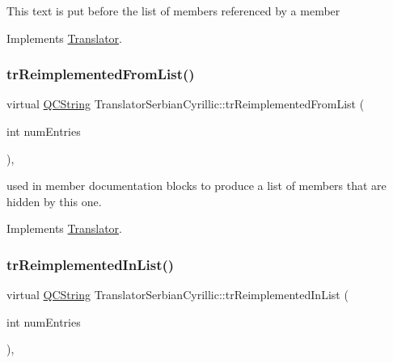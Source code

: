 This text is put before the list of members referenced by a member 

Implements \mbox{\hyperlink{class_translator}{Translator}}.

\mbox{\label{class_translator_serbian_cyrillic_a3b5b178ee91fdb6453c37adf68b8f329}} 
\subsubsection{\texorpdfstring{trReimplementedFromList()}{trReimplementedFromList()}}
{\footnotesize\ttfamily virtual \mbox{\hyperlink{class_q_c_string}{Q\+C\+String}} Translator\+Serbian\+Cyrillic\+::tr\+Reimplemented\+From\+List (\begin{DoxyParamCaption}\item[{int}]{num\+Entries }\end{DoxyParamCaption})\hspace{0.3cm}{\ttfamily [inline]}, {\ttfamily [virtual]}}

used in member documentation blocks to produce a list of members that are hidden by this one. 

Implements \mbox{\hyperlink{class_translator}{Translator}}.

\mbox{\label{class_translator_serbian_cyrillic_aa81e6f588e7cdf62347c04b0979aa889}} 
\subsubsection{\texorpdfstring{trReimplementedInList()}{trReimplementedInList()}}
{\footnotesize\ttfamily virtual \mbox{\hyperlink{class_q_c_string}{Q\+C\+String}} Translator\+Serbian\+Cyrillic\+::tr\+Reimplemented\+In\+List (\begin{DoxyParamCaption}\item[{int}]{num\+Entries }\end{DoxyParamCaption})\hspace{0.3cm}{\ttfamily [inline]}, {\ttfamily [virtual]}}

